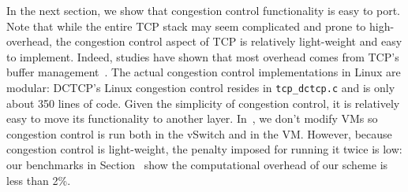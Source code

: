 In the next section, we show that congestion control functionality is easy to 
port. Note that while the entire TCP stack may seem complicated and prone to 
high-overhead, the congestion control aspect of TCP is relatively light-weight and easy 
to implement. Indeed, studies have shown that most overhead comes from TCP's buffer 
management~\cite{optimize-tcp-receive}. The actual congestion control implementations in 
Linux are modular: DCTCP's Linux congestion control resides in {\tt tcp\_dctcp.c} and is 
only about 350 lines of code. Given the simplicity of congestion control, it is 
relatively easy to move its functionality to another layer. In~\acdc{}, we don't modify 
VMs so congestion control is run both in the vSwitch and in the VM. However, because 
congestion control is light-weight, the penalty imposed for running it twice is low: our 
benchmarks in Section~ show the computational overhead of our scheme is less 
than 2\%.
